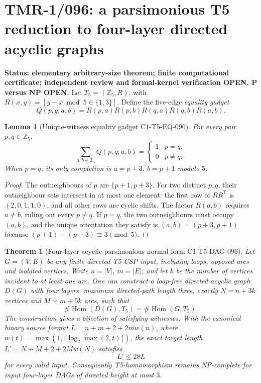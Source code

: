 \documentclass[11pt]{article}
\newtheorem{lemma}{Lemma}
\newtheorem{theorem}{Theorem}
\begin{document}
\section{TMR-1/096: a parsimonious T5 reduction to four-layer directed acyclic graphs}
\noindent\textbf{Status: elementary arbitrary-size theorem; finite computational
certificate; independent review and formal-kernel verification OPEN.
P versus NP OPEN.}
Let $T_5=(\mathbb Z_5,R)$, with
$R(x,y)=[y-x\bmod5\in\{1,3\}]$.
Define the five-edge \emph{equality gadget}
\[
   Q(p,q;a,b)=R(p,a)R(p,b)R(q,a)R(q,b)R(a,b).
\]
\begin{lemma}[Unique-witness equality gadget C1-T5-EQ-096]
For every pair $p,q\in\mathbb Z_5$,
\[
\sum_{a,b\in\mathbb Z_5} Q(p,q;a,b)
=\begin{cases}1&p=q,\\0&p\neq q.\end{cases}
\]
When $p=q$, its only completion is $a=p+3$, $b=p+1$
modulo $5$.
\end{lemma}
\begin{proof}
The outneighbours of $p$ are $\{p+1,p+3\}$.  For two
distinct $p,q$, their outneighbour sets intersect in at most one
element: the first row of $RR^{\mathsf T}$ is $(2,0,1,1,0)$,
and all other rows are cyclic shifts.
The factor $R(a,b)$ requires $a\neq b$, ruling out every
$p\neq q$.  If $p=q$, the two outneighbours must occupy $(a,b)$,
and the unique orientation they satisfy is
$(a,b)=(p+3,p+1)$ because $(p+1)-(p+3)\equiv3\pmod5$.
\end{proof}
\begin{theorem}[Four-layer acyclic parsimonious normal form C1-T5-DAG-096]
Let $G=(V,E)$ be any finite directed T5-CSP input, including
loops, opposed arcs and isolated vertices.  Write
$n=|V|$, $m=|E|$, and let $k$ be the number of vertices incident
to at least one arc.  One can construct a loop-free directed
acyclic graph $D(G)$ with four layers, maximum directed-path length
three, exactly $N=n+3k$ vertices and $M=m+5k$ arcs, such that
\[
\boxed{\#\operatorname{Hom}(D(G),T_5)
      =\#\operatorname{Hom}(G,T_5).}
\]
The construction gives a bijection of satisfying witnesses.
With the canonical binary source format
$L=n+m+2+2mw(n)$, where
$w(t)=\max(1,\lceil\log_2\max(2,t)\rceil)$, the exact target
length $L'=N+M+2+2Mw(N)$ satisfies
\[
\boxed{L'\le28L}
\]
for every valid input.  Consequently T5-homomorphism remains
NP-complete for input four-layer DAGs of directed height at most $3$.
\end{theorem}
\end{document}
